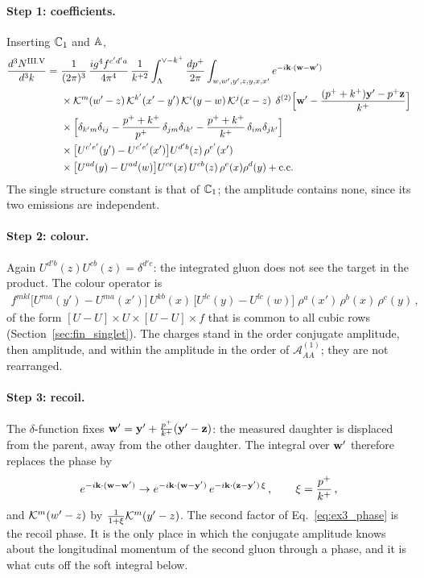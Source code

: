 \paragraph{Step 1: coefficients.} Inserting $\mathbb{C}_1$ and $\mathbb{A}$,
\begin{align}\label{eq:ex3_start}
\frac{d^3N^{\rm III.V}}{d^3k}=\ &\frac{1}{(2\pi)^3}\,\frac{ig^4f^{c'd'a}}{4\pi^4}\,\frac{1}{k^{+2}}\int_\Lambda^{\vee-k^+}\frac{dp^+}{2\pi}\int_{w,w',y',z,y,x,x'}e^{-i\v k\cdot(\v w-\v w')}\notag\\
&\times\Kv^m(w'-z)\,\Kv^{k'}(x'-y')\,\Kv^i(y-w)\,\Kv^j(x-z)\;\,\delta^{(2)}\Big[\v w'-\frac{(p^++k^+)\v y'-p^+\v z}{k^+}\Big]\notag\\
&\times\Big[\delta_{k'm}\delta_{ij}-\frac{p^++k^+}{p^+}\,\delta_{jm}\delta_{ik'}-\frac{p^++k^+}{k^+}\,\delta_{im}\delta_{jk'}\Big]\notag\\
&\times\big[U^{c'e'}(y')-U^{c'e'}(x')\big]U^{d'b}(z)\,\rho^{e'}(x')\notag\\
&\times\big[U^{ad}(y)-U^{ad}(w)\big]U^{ce}(x)\,U^{cb}(z)\,\rho^e(x)\rho^d(y)+{\rm c.c.}
\end{align}
The single structure constant is that of $\mathbb{C}_1$; the amplitude contains none, since its two emissions are independent.

\paragraph{Step 2: colour.} Again $U^{d'b}(z)U^{cb}(z)=\delta^{d'c}$: the integrated gluon does not see the target in the product. The colour operator is
\begin{align}\label{eq:ex3_colour}
f^{mkl}\big[U^{ma}(y')-U^{ma}(x')\big]\,U^{kb}(x)\,\big[U^{lc}(y)-U^{lc}(w)\big]\;\rho^a(x')\,\rho^b(x)\,\rho^c(y)\,,
\end{align}
of the form $[U-U]\times U\times[U-U]\times f$ that is common to all cubic rows (Section~\ref{sec:fin_singlet}). The charges stand in the order conjugate amplitude, then amplitude, and within the amplitude in the order of $\mathcal A^{(1)}_{AA}$; they are not rearranged.

\paragraph{Step 3: recoil.} The $\delta$-function fixes $\mathbf{w}'=\mathbf{y}'+\frac{p^+}{k^+}(\mathbf{y}'-\mathbf{z})$: the measured daughter is displaced from the parent, away from the other daughter. The integral over $\mathbf{w}'$ therefore replaces the phase by
\begin{align}\label{eq:ex3_phase}
e^{-i\mathbf{k}\cdot(\mathbf{w}-\mathbf{w}')}\to e^{-i\mathbf{k}\cdot(\mathbf{w}-\mathbf{y}')}\,e^{-i\mathbf{k}\cdot(\mathbf{z}-\mathbf{y}')\,\xi}\,,\qquad\xi=\frac{p^+}{k^+}\,,
\end{align}
and $\mathcal{K}^m(w'-z)$ by $\frac{1}{1+\xi}\mathcal{K}^m(y'-z)$. The second factor of Eq.~\eqref{eq:ex3_phase} is the recoil phase. It is the only place in which the conjugate amplitude knows about the longitudinal momentum of the second gluon through a phase, and it is what cuts off the soft integral below.

